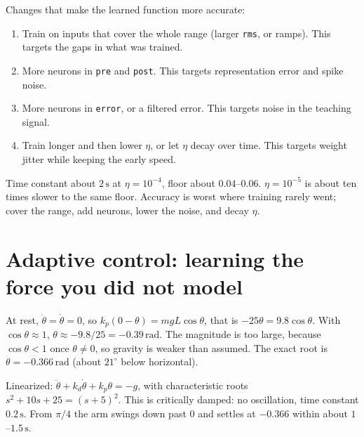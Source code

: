 \documentclass[11pt,letterpaper]{article}
\newcommand{\ans}[1]{\par\vspace{4pt}{\bfseries #1}\quad}
\begin{document}
Changes that make the learned function more accurate:
\begin{enumerate}[label=(\roman*), leftmargin=1.8em, itemsep=1pt, topsep=2pt]
\item Train on inputs that cover the whole range (larger \texttt{rms}, or ramps). This targets the gaps in what was trained.
\item More neurons in \texttt{pre} and \texttt{post}. This targets representation error and spike noise.
\item More neurons in \texttt{error}, or a filtered error. This targets noise in the teaching signal.
\item Train longer and then lower $\eta$, or let $\eta$ decay over time. This targets weight jitter while keeping the early speed.
\end{enumerate}
\begin{result}
Time constant about $2\,\mathrm s$ at $\eta = 10^{-4}$, floor about $0.04$--$0.06$. $\eta = 10^{-5}$ is about ten times slower to the same floor. Accuracy is worst where training rarely went; cover the range, add neurons, lower the noise, and decay $\eta$.
\end{result}

\section{Adaptive control: learning the force you did not model}

\ans{Q1}
At rest, $\ddot\theta = \dot\theta = 0$, so $k_p(0 - \theta) = mgL\cos\theta$, that is $-25\theta = 9.8\cos\theta$. With $\cos\theta \approx 1$, $\theta \approx -9.8/25 = -0.39\,\mathrm{rad}$. The magnitude is too large, because $\cos\theta < 1$ once $\theta \ne 0$, so gravity is weaker than assumed. The exact root is $\theta = -0.366\,\mathrm{rad}$ (about $21^\circ$ below horizontal).

Linearized: $\ddot\theta + k_d\dot\theta + k_p\theta = -g$, with characteristic roots $s^2 + 10s + 25 = (s + 5)^2$. This is critically damped: no oscillation, time constant $0.2\,\mathrm{s}$. From $\pi/4$ the arm swings down past $0$ and settles at $-0.366$ within about $1$--$1.5\,\mathrm{s}$.
\end{document}
